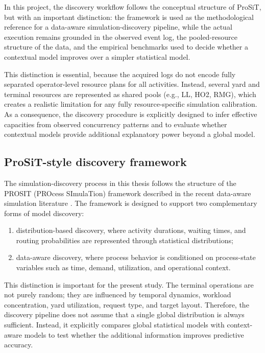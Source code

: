 In this project, the discovery workflow follows the conceptual structure of ProSiT, but with an important distinction:
the framework is used as the methodological reference for a data-aware simulation-discovery pipeline, while the actual execution remains grounded in the observed event log, the pooled-resource structure of the data, and the empirical benchmarks used to decide whether a contextual model improves over a simpler statistical model.

This distinction is essential, because the acquired logs do not encode fully separated operator-level resource plans for all activities.
Instead, several yard and terminal resources are represented as shared pools (e.g., LL, HO2, RMG), which creates a realistic limitation for any fully resource-specific simulation calibration.
As a consequence, the discovery procedure is explicitly designed to infer effective capacities from observed concurrency patterns and to evaluate whether contextual models provide additional explanatory power beyond a global model.

\subsection{ProSiT-style discovery framework}

The simulation-discovery process in this thesis follows the structure of the PROSIT (PROcess SImulaTion) framework described in the recent data-aware simulation literature \cite{Vinci2026prosit}.
The framework is designed to support two complementary forms of model discovery:

\begin{enumerate}
    \item distribution-based discovery, where activity durations, waiting times, and routing probabilities are represented through statistical distributions;
    \item data-aware discovery, where process behavior is conditioned on process-state variables such as time, demand, utilization, and operational context.
\end{enumerate}

This distinction is important for the present study.
The terminal operations are not purely random;
they are influenced by temporal dynamics, workload concentration, yard utilization, request type, and target layout.
Therefore, the discovery pipeline does not assume that a single global distribution is always sufficient.
Instead, it explicitly compares global statistical models with context-aware models to test whether the additional information improves predictive accuracy.

